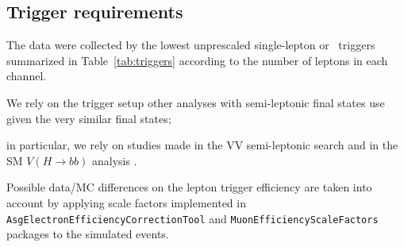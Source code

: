 \subsection{Trigger requirements}
\label{subsec:trigger_requirements}
The data were collected by the lowest unprescaled single-lepton or \met\ triggers summarized in Table~\ref{tab:triggers} according to the number of leptons in each channel.

We rely on the trigger setup other analyses with semi-leptonic final states use given the very similar final states;

in particular, we rely on studies made 
in the VV semi-leptonic search \cite{Bachas:2646593}
and in the SM $V\left(H\to bb\right)$ analysis \cite{HIGG-2018-04, ATL-COM-PHYS-2018-517}. 





Possible data/MC differences on the lepton trigger efficiency are taken into account by applying scale factors implemented in \texttt{AsgElectronEfficiencyCorrectionTool} and \texttt{MuonEfficiencyScaleFactors} packages to the simulated events.

